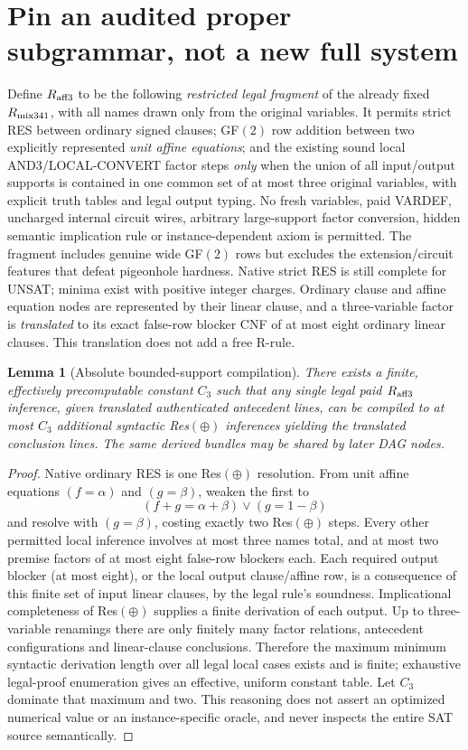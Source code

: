 \documentclass[11pt]{article}
\newtheorem{lemma}[theorem]{Lemma}
\begin{document}
\section*{Pin an audited proper subgrammar, not a new full system}
Define $R_{\rm aff3}$ to be the following \emph{restricted legal fragment} of the already fixed $R_{\rm mix341}$, with all names drawn only from the original variables. It permits strict RES between ordinary signed clauses; GF$(2)$ row addition between two explicitly represented \emph{unit affine equations}; and the existing sound local AND3/LOCAL-CONVERT factor steps \emph{only} when the union of all input/output supports is contained in one common set of at most three original variables, with explicit truth tables and legal output typing. No fresh variables, paid VARDEF, uncharged internal circuit wires, arbitrary large-support factor conversion, hidden semantic implication rule or instance-dependent axiom is permitted. The fragment includes genuine wide GF$(2)$ rows but excludes the extension/circuit features that defeat pigeonhole hardness. Native strict RES is still complete for UNSAT; minima exist with positive integer charges. Ordinary clause and affine equation nodes are represented by their linear clause, and a three-variable factor is \emph{translated} to its exact false-row blocker CNF of at most eight ordinary linear clauses. This translation does not add a free R-rule.

\begin{lemma}[Absolute bounded-support compilation]
There exists a finite, effectively precomputable constant $C_3$ such that any single legal paid $R_{\rm aff3}$ inference, given translated authenticated antecedent lines, can be compiled to at most $C_3$ additional \emph{syntactic} Res$(\oplus)$ inferences yielding the translated conclusion lines. The same derived bundles may be shared by later DAG nodes.
\end{lemma}
\begin{proof}
Native ordinary RES is one Res$(\oplus)$ resolution. From unit affine equations $(f=\alpha)$ and $(g=\beta)$, weaken the first to
\[
 (f+g=\alpha+\beta)\vee(g=1-\beta)
\]
and resolve with $(g=\beta)$, costing exactly two Res$(\oplus)$ steps. Every other permitted local inference involves at most three names total, and at most two premise factors of at most eight false-row blockers each. Each required output blocker (at most eight), or the local output clause/affine row, is a consequence of this finite set of input linear clauses, by the legal rule's soundness. Implicational completeness of Res$(\oplus)$ supplies a finite derivation of each output. Up to three-variable renamings there are only finitely many factor relations, antecedent configurations and linear-clause conclusions. Therefore the maximum minimum syntactic derivation length over all legal local cases exists and is finite; exhaustive legal-proof enumeration gives an effective, uniform constant table. Let $C_3$ dominate that maximum and two. This reasoning does not assert an optimized numerical value or an instance-specific oracle, and never inspects the entire SAT source semantically.
\end{proof}
\end{document}
